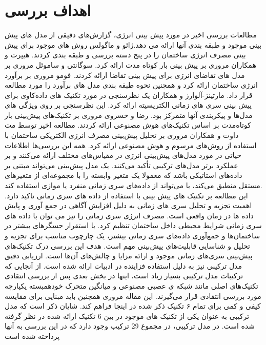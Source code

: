 \section[اهداف بررسی]{اهداف بررسی\cite{DEB2017902}}
مطالعات بررسی اخیر در مورد پیش بینی انرژی، گزارش‌های دقیقی از مدل های پیش بینی موجود و طبقه بندی آنها ارائه می دهد.ژائو  و ماگولس روش های موجود برای پیش بینی مصرف انرژی ساختمان را در پنج دسته بررسی و طبقه بندی کردند. هیپرت و همکاران مروری بر پیش بینی بار کوتاه مدت ارائه کرد. سوگانتی و ساموئل مروری بر مدل های تقاضای انرژی برای پیش بینی تقاضا ارائه کردند. فومو مروری بر برآورد انرژی ساختمان ارائه کرد و همچنین نحوه طبقه بندی مدل های برآورد را مورد مطالعه قرار داد. مارتینز-آلوارز و همکاران یک نظرسنجی در مورد تکنیک های داده‌کاوی برای پیش بینی سری های زمانی الکتریسیته ارائه کرد. این نظرسنجی بر روی ویژگی های مدل‌ها و پیکربندی آنها متمرکز بود. رضا و خسروی مروری بر تکنیک‌های پیش‌بینی بار کوتاه‌مدت بر اساس تکنیک‌های هوش مصنوعی ارائه کردند. مطالعه اخیر توسط مت داوت و همکاران مروری بر تحلیل پیش‌بینی مصرف انرژی الکتریکی ساختمان با استفاده از روش‌های مرسوم و هوش مصنوعی ارائه کرد. 
همه این بررسی‌ها اطلاعات حیاتی در مورد مدل‌های پیش‌بینی انرژی در مقیاس‌های مختلف ارائه می‌کنند و بر عملکرد برتر مدل‌های ترکیبی تأکید می‌کنند. یک مدل پیش‌بینی می‌تواند مبتنی بر داده‌های استاتیکی باشد که معمولا یک متغیر وابسته را با مجموعه‌ای از متغیرهای مستقل منطبق می‌کند، یا می‌تواند از داده‌های سری زمانی منفرد یا موازی استفاده کند. 
\\
این مطالعه بر تکنیک های پیش بینی با استفاده از داده های سری زمانی تاکید دارد. اهمیت تجزیه و تحلیل سری های زمانی به دلیل افزایش آگاهی در جمع آوری و پایش داده ها در زمان واقعی است. مصرف انرژی سری زمانی را نیز می توان با داده های سری زمانی شرایط محیطی داخل ساختمان تنظیم کرد. با استقرار حسگرهای بیشتر در ساختمان‌ها و جمع‌آوری داده‌های سری زمانی بیشتر، یک چارچوب مناسب برای تجزیه و تحلیل و شناسایی قابلیت‌های پیش‌بینی مهم است. هدف این بررسی درک تکنیک‌های پیش‌بینی سری‌های زمانی موجود و ارائه مزایا و چالش‌های آن‌ها است. ارزیابی دقیق مدل ترکیبی نیز به دلیل استفاده فزاینده در ادبیات ارائه شده است. از آنجایی که ترکیبات مدل ترکیبی بسیار زیاد است، اینها در بخش بعدی پس از بررسی انتقادی تکنیک‌های اصلی مانند شبکه ی عصبی مصنوعی و میانگین متحرک خودهمبسته یکپارچه مورد بررسی انتقادی قرار می‌گیرند. این مقاله مروری همچنین باید مبنایی برای مقایسه کیفی و کمی برای تمام ۶ تکنیک ذکر شده در اینجا فراهم کند. شایان ذکر است که مدل ترکیبی به عنوان یکی از تکنیک های موجود در بین 6 تکنیک ارائه شده در نظر گرفته شده است. در مدل ترکیبی، در مجموع 29 ترکیب وجود دارد که در این بررسی به آنها پرداخته شده است
